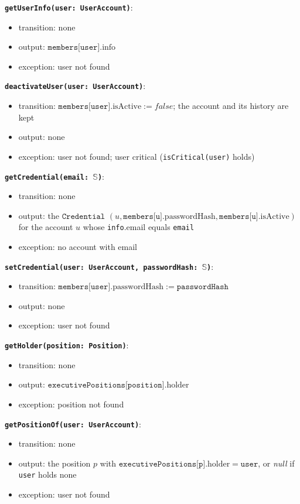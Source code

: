 \documentclass[12pt, titlepage]{article}
\begin{document}
\textbf{\texttt{getUserInfo(user: UserAccount)}}:
\begin{itemize}
  \item transition: none
  \item output: $\texttt{members[user]}.\text{info}$
  \item exception: user not found
\end{itemize}

\textbf{\texttt{deactivateUser(user: UserAccount)}}:
\begin{itemize}
  \item transition: $\texttt{members[user]}.\text{isActive} := \textit{false}$; the account and its history are kept
  \item output: none
  \item exception: user not found; user critical (\texttt{isCritical(user)} holds)
\end{itemize}

\textbf{\texttt{getCredential(email: $\mathbb{S}$)}}:
\begin{itemize}
  \item transition: none
  \item output: the $\texttt{Credential}$ $(u, \texttt{members[u]}.\text{passwordHash}, \texttt{members[u]}.\text{isActive})$ for the account $u$ whose \texttt{info}.email equals \texttt{email}
  \item exception: no account with email
\end{itemize}

\textbf{\texttt{setCredential(user: UserAccount, passwordHash: $\mathbb{S}$)}}:
\begin{itemize}
  \item transition: $\texttt{members[user]}.\text{passwordHash} := \texttt{passwordHash}$
  \item output: none
  \item exception: user not found
\end{itemize}

\textbf{\texttt{getHolder(position: Position)}}:
\begin{itemize}
  \item transition: none
  \item output: $\texttt{executivePositions[position]}.\text{holder}$
  \item exception: position not found
\end{itemize}

\textbf{\texttt{getPositionOf(user: UserAccount)}}:
\begin{itemize}
  \item transition: none
  \item output: the position $p$ with $\texttt{executivePositions[p]}.\text{holder} = \texttt{user}$, or \textit{null} if \texttt{user} holds none
  \item exception: user not found
\end{itemize}
\end{document}
